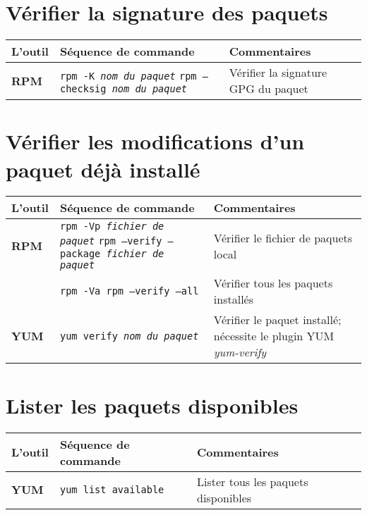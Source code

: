 \documentclass[10pt,a4paper]{article}
\newcommand{\tabellenkopf}{
  \textbf{L'outil} & \textbf{Séquence de commande} & \textbf{Commentaires} \\
}
\begin{document}
\section{Vérifier la signature des paquets}
\begin{tabular}{ p{3.5cm} p{9cm} p{11cm}}
  \hline
  \rowcolor{Gray}
  \tabellenkopf
  \hline 
  \textbf{RPM} & \texttt{rpm -K \textit{nom du paquet}} \newline \texttt{rpm --checksig \textit{nom du paquet}} & Vérifier la signature GPG du paquet \\
  \hline
\end{tabular}

\section{Vérifier les modifications d'un paquet déjà installé}
\begin{tabular}{ p{3.5cm} p{9cm} p{11cm}}
  \hline
  \rowcolor{Gray}
  \tabellenkopf
  \hline 
  \textbf{RPM} & \texttt{rpm -Vp \textit{fichier de paquet}} \newline \texttt{rpm --verify --package \textit{fichier de paquet}} & Vérifier le fichier de paquets local\\
  \rowcolor{Gray}
  & \texttt{rpm -Va \newline \texttt{rpm --verify --all }} & Vérifier tous les paquets installés \\
  \textbf{YUM} & \texttt{yum verify \textit{nom du paquet}} & Vérifier le paquet installé; nécessite le plugin YUM \textit{yum-verify} \\
  \hline
\end{tabular}

\newpage

\cheatsheet

\section{Lister les paquets disponibles}
\begin{tabular}{ p{3.5cm} p{9cm} p{11cm}}
  \hline
  \rowcolor{Gray}
  \tabellenkopf
  \hline 
  \textbf{YUM} & \texttt{yum list available} & Lister tous les paquets disponibles \\
  \hline
\end{tabular}
\end{document}
